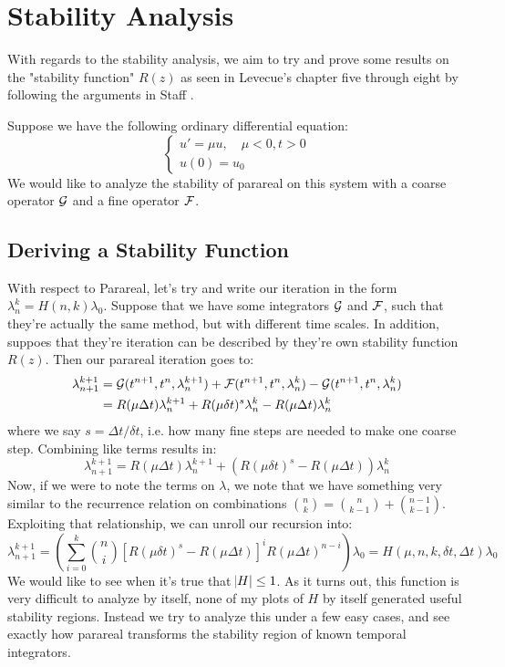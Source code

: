 \section{Stability Analysis}

With regards to the stability analysis, we aim to try and prove some results on
the "stability function" $R(z)$ as seen in Levecue's \cite{levecue} chapter five
through eight by following the arguments in Staff \cite{staff}.

Suppose we have the following ordinary differential equation:
\begin{equation} \label{eq:lode}
  \begin{cases}
    u' = \mu u, \quad \mu < 0, t > 0 \\
    u(0) = u_0
  \end{cases}
\end{equation}
We would like to analyze the stability of parareal on this system with a 
coarse operator $\mathcal{G}$ and a fine operator $\mathcal{F}$.

\subsection{Deriving a Stability Function}

With respect to Parareal, let's try and write our iteration in the form
$\lambda_n^k = H(n,k)\lambda_0$. Suppose that we have some integrators $\mathcal{G}$
and $\mathcal{F}$, such that they're actually the same method, but with different time
scales. In addition, suppoes that they're iteration can be described by they're
own stability function $R(z)$. Then our parareal iteration goes to:
\begin{align*}
  \lambda_{n+1}^{k+1} & = \mathcal{G}(t^{n+1},t^n,\lambda_n^{k+1}) +
  \mathcal{F}(t^{n+1},t^n,\lambda_n^k) -
  \mathcal{G}(t^{n+1},t^n,\lambda_n^k) \\
  & = R(\mu\Delta t)\lambda_n^{k+1} + 
  R(\mu\delta t)^s \lambda_n^k -
  R(\mu\Delta t)\lambda_n^k \\
\end{align*}
where we say $s = \Delta t/ \delta t$, i.e. how many fine steps are needed to
make one coarse step. Combining like terms results in:
\[
  \lambda_{n+1}^{k+1} = 
  R(\mu\Delta t)\lambda_n^{k+1} + 
  \left( R(\mu\delta t)^s - R(\mu\Delta t)\right) \lambda_n^k 
\]
Now, if we were to note the terms on $\lambda$, we note that we have something
very similar to the recurrence relation on combinations $\binom{n}{k} =
\binom{n}{k-1} + \binom{n-1}{k-1}$. Exploiting that relationship, we can unroll
our recursion into:
\[
  \lambda_{n+1}^{k+1} = \left( \sum_{i=0}^k \binom{n}{i} \left[R(\mu \delta t)^s -
    R(\mu \Delta t)\right]^i R(\mu \Delta t)^{n-i} \right) \lambda_0 =
    H(\mu, n,k,\delta t, \Delta t) \lambda_0
\]
We would like to see when it's true that $\abs{H} \leq 1$. As it turns out, this
function is very difficult to analyze by itself, none of my plots of $H$ by
itself generated useful stability regions. Instead we try to analyze this under
a few easy cases, and see exactly how parareal transforms the stability region
of known temporal integrators.

